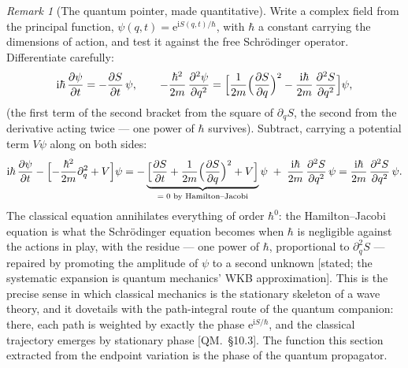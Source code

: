 \documentclass[11pt]{article}
\theoremstyle{plain}
\theoremstyle{definition}
\theoremstyle{remark}
\newtheorem{remark}[theorem]{Remark}
\newcommand{\ee}{\mathrm{e}}
\newcommand{\ii}{\mathrm{i}}
\newcommand{\pd}[2]{\frac{\partial #1}{\partial #2}}
\begin{document}
\begin{remark}[The quantum pointer, made quantitative]
\label{rem:hj-quantum}
Write a complex field from the principal function,
$\psi(q, t) = \ee^{\ii S(q,t)/\hbar}$, with $\hbar$ a constant
carrying the dimensions of action, and test it against the free
Schr\"odinger operator. Differentiate carefully:
\begin{equation}
  \ii\hbar\,\pd{\psi}{t} = -\pd{S}{t}\,\psi,
  \qquad
  -\frac{\hbar^2}{2m}\,\frac{\partial^2\psi}{\partial q^2}
  = \Bigl[\frac{1}{2m}\Bigl(\pd{S}{q}\Bigr)^{2}
    - \frac{\ii\hbar}{2m}\,\frac{\partial^2 S}{\partial q^2}
    \Bigr]\psi ,
\end{equation}
(the first term of the second bracket from the square of
$\partial_q S$, the second from the derivative acting twice ---
one power of $\hbar$ survives). Subtract, carrying a potential term $V\psi$ along on both sides:
\begin{equation}
  \ii\hbar\,\pd{\psi}{t}
  - \Bigl[-\frac{\hbar^2}{2m}\partial_q^2 + V\Bigr]\psi
  = -\underbrace{\Bigl[\pd{S}{t}
    + \frac{1}{2m}\Bigl(\pd{S}{q}\Bigr)^2 + V\Bigr]}_{=\;0
    \text{ by Hamilton--Jacobi}}\psi
  \;+\; \frac{\ii\hbar}{2m}\,\frac{\partial^2 S}{\partial q^2}\,\psi
  = \frac{\ii\hbar}{2m}\,\frac{\partial^2 S}{\partial q^2}\,\psi .
\end{equation}
The classical equation annihilates everything of order $\hbar^0$: the
Hamilton--Jacobi equation is what the Schr\"odinger equation becomes
when $\hbar$ is negligible against the actions in play, with the
residue --- one power of $\hbar$, proportional to $\partial_q^2 S$ ---
repaired by promoting the amplitude of $\psi$ to a second unknown
[stated; the systematic expansion is quantum mechanics' WKB
approximation]. This is the precise sense in which classical mechanics
is the stationary skeleton of a wave theory, and it dovetails with the
path-integral route of the quantum companion: there, each path is
weighted by exactly the phase $\ee^{\ii S/\hbar}$, and the classical
trajectory emerges by stationary phase [QM.\ \S10.3]. The function
this section extracted from the endpoint variation is the phase of the
quantum propagator.
\end{remark}
\end{document}
